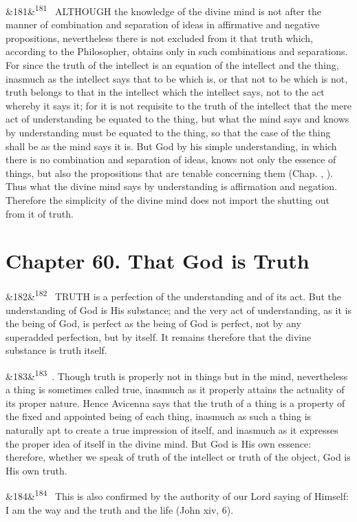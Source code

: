 \documentclass[12pt]{article}
\newcommand{\para}[1][]{\par\noindent\ifx&#1&\else\textsuperscript{\footnotesize #1}~\fi}
\begin{document}
\para[181] ALTHOUGH the knowledge of the divine mind is not after the manner of combination and separation of ideas in affirmative and negative propositions, nevertheless there is not excluded from it that truth which, according to the Philosopher, obtains only in such combinations and separations. For since the truth of the intellect is an equation of the intellect and the thing, inasmuch as the intellect says that to be which is, or that not to be which is not, truth belongs to that in the intellect which the intellect says, not to the act whereby it says it; for it is not requisite to the truth of the intellect that the mere act of understanding be equated to the thing, but what the mind says and knows by understanding must be equated to the thing, so that the case of the thing shall be as the mind says it is. But God by his simple understanding, in which there is no combination and separation of ideas, knows not only the essence of things, but also the propositions that are tenable concerning them (Chap. , ). Thus what the divine mind says by understanding is affirmation and negation. Therefore the simplicity of the divine mind does not import the shutting out from it of truth.

\section*{Chapter 60. That God is Truth}

\para[182] TRUTH is a perfection of the understanding and of its act. But the understanding of God is His substance; and the very act of understanding, as it is the being of God, is perfect as the being of God is perfect, not by any superadded perfection, but by itself. It remains therefore that the divine substance is truth itself.

\para[183] 4. Though truth is properly not in things but in the mind, nevertheless a thing is sometimes called true, inasmuch as it properly attains the actuality of its proper nature. Hence Avicenna says that the truth of a thing is a property of the fixed and appointed being of each thing, inasmuch as such a thing is naturally apt to create a true impression of itself, and inasmuch as it expresses the proper idea of itself in the divine mind. But God is His own essence: therefore, whether we speak of truth of the intellect or truth of the object, God is His own truth.

\para[184] This is also confirmed by the authority of our Lord saying of Himself: I am the way and the truth and the life (John xiv, 6).
\end{document}
